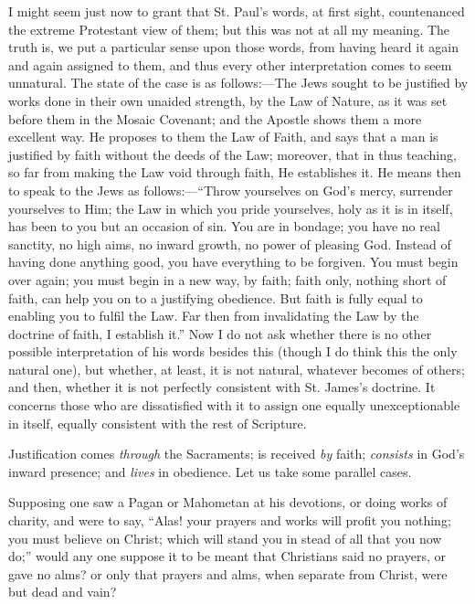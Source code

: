 I might seem just now to grant that St. Paul's words, at first
sight, countenanced the extreme Protestant view of them; but this was
not at all my meaning. The truth is, we put a particular sense upon
those words, from having heard it again and again assigned to them,
and thus every other interpretation comes to seem unnatural. The state
of the case is as follows:—The Jews sought to be justified by works
done in their own unaided strength, by the Law of Nature, as it was
set before them in the Mosaic Covenant; and the Apostle shows them a
more excellent way. He proposes to them the Law of Faith, and says
that a man is justified by faith without the deeds of the Law;
moreover, that in thus teaching, so far from making the Law void
through faith, He establishes it. He means then to speak to the Jews
as follows:—``Throw yourselves on God's mercy, surrender
yourselves to Him; the Law in which you pride yourselves, holy as it
is in itself, has been to you but an occasion of sin. You are in
bondage; you have no real sanctity, no high aims, no inward growth, no
power of pleasing God. Instead of having done anything good, you have
everything to be forgiven. You must begin over again; you must begin
in a new way, by faith; faith only, nothing short of faith, can help
you on to a justifying obedience. But faith is fully equal to enabling
you to fulfil the Law. Far then from invalidating the Law by the
doctrine of faith, I establish it.'' Now I do not ask whether
there is no other possible interpretation of his words besides this
(though I do think this the only natural one), but whether, at least,
it is not natural, whatever becomes of others; and then, whether
it is not perfectly consistent with St. James's doctrine. It concerns
those who are dissatisfied with it to assign one equally
unexceptionable in itself, equally consistent with the rest of
Scripture.

Justification comes \emph{through} the Sacraments; is received \emph{by}
faith; \emph{consists} in God's inward presence; and \emph{lives} in
obedience. Let us take some parallel cases.

Supposing one saw a Pagan or Mahometan at his devotions, or doing
works of charity, and were to say, ``Alas! your prayers and works
will profit you nothing; you must believe on Christ; which will stand
you in stead of all that you now do;'' would any one suppose it to
be meant that Christians said no prayers, or gave no alms? or only
that prayers and alms, when separate from Christ, were but dead and
vain?

